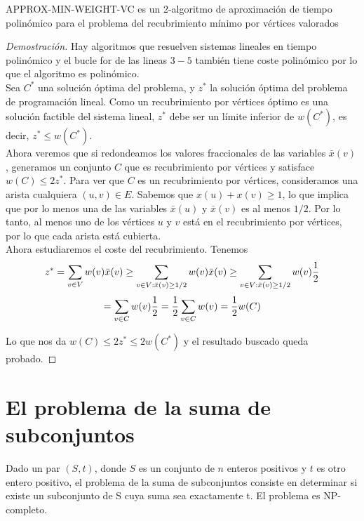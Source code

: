 \documentclass{article}
\begin{document}
\begin{thr}
APPROX-MIN-WEIGHT-VC es un 2-algoritmo de aproximación de tiempo polinómico para el problema del recubrimiento mínimo por vértices valorados
\end{thr}
\begin{proof}[Demostración]
Hay algoritmos que resuelven sistemas lineales en tiempo polinómico y el bucle for de las lineas $3-5$ también tiene coste polinómico por lo que el algoritmo es polinómico.\\
Sea $C^{*}$ una solución óptima del problema, y $z^{*}$ la solución óptima del problema de programación lineal. Como un recubrimiento por vértices óptimo es una solución factible del sistema lineal, $z^{*}$ debe ser un límite inferior de $w(C^{*})$, es decir, $z^{*} \leq w(C^{*})$.\\
Ahora veremos que si redondeamos los valores fraccionales de las variables $
\bar{x}(v)$, generamos un conjunto $C$ que es recubrimiento por vértices y satisface $w(C) \leq 2z^{*}$. Para ver que $C$ es un recubrimiento por vértices, consideramos una arista cualquiera $(u,v) \in E$. Sabemos que $x(u) + x(v) \geq 1$, lo que implica que por lo menos una de las variables $\bar{x}(u)$ y $\bar{x}(v)$ es al menos $1/2$. Por lo tanto, al menos uno de los vértices $u$ y $v$ está en el recubrimiento por vértices, por lo que cada arista está cubierta.\\
Ahora estudiaremos el coste del recubrimiento. Tenemos\\
	\[
	z^{*} = \sum_{v\in V}w(v)\bar{x}(v) \\
	\geq \sum_{v\in V:\bar{x}(v)\geq 1/2}w(v)\bar{x}(v) 
	\geq \sum_{v\in V:\bar{x}(v)\geq 1/2}w(v)\frac{1}{2} 
	\]
\[
	= \sum_{v\in C}w(v)\frac{1}{2} =\frac{1}{2}\sum_{v\in C}w(v) \\
	= \frac{1}{2}w(C)
\]

Lo que nos da $w(C) \leq 2z^{*} \leq 2w(C^{*})$ y el resultado buscado queda probado.

\end{proof}

\section{El problema de la suma de subconjuntos}
Dado un par $(S,t)$, donde $S$ es un conjunto de $n$ enteros positivos y $t$ es otro entero positivo, el problema de la suma de subconjuntos consiste en determinar si existe un subconjunto de S cuya suma sea exactamente t. El problema es NP-completo.\\
\end{document}

